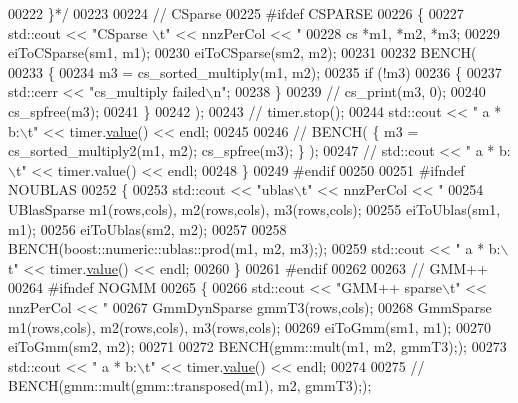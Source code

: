 \begin{DoxyCode}
{{{{{00222 \textcolor{comment}{    \}*/}
00223 
00224     \textcolor{comment}{// CSparse}
00225 \textcolor{preprocessor}{    #ifdef CSPARSE}
00226     \{
00227       std::cout << \textcolor{stringliteral}{"CSparse \(\backslash\)t"} << nnzPerCol << \textcolor{stringliteral}{"%
00228       cs *m1, *m2, *m3;
00229       eiToCSparse(sm1, m1);
00230       eiToCSparse(sm2, m2);
00231 
00232       BENCH(
00233       \{
00234         m3 = cs\_sorted\_multiply(m1, m2);
00235         \textcolor{keywordflow}{if} (!m3)
00236         \{
00237           std::cerr << \textcolor{stringliteral}{"cs\_multiply failed\(\backslash\)n"};
00238         \}
00239 \textcolor{comment}{//         cs\_print(m3, 0);}
00240         cs\_spfree(m3);
00241       \}
00242       );
00243 \textcolor{comment}{//       timer.stop();}
00244       std::cout << \textcolor{stringliteral}{"   a * b:\(\backslash\)t"} << timer.\hyperlink{class_eigen_1_1_bench_timer_a26760f963ed8b64c126159bfea57735e}{value}() << endl;
00245 
00246 \textcolor{comment}{//       BENCH( \{ m3 = cs\_sorted\_multiply2(m1, m2); cs\_spfree(m3); \} );}
00247 \textcolor{comment}{//       std::cout << "   a * b:\(\backslash\)t" << timer.value() << endl;}
00248     \}
00249 \textcolor{preprocessor}{    #endif}
00250 
00251 \textcolor{preprocessor}{    #ifndef NOUBLAS}
00252     \{
00253       std::cout << \textcolor{stringliteral}{"ublas\(\backslash\)t"} << nnzPerCol << \textcolor{stringliteral}{"%
00254       UBlasSparse m1(rows,cols), m2(rows,cols), m3(rows,cols);
00255       eiToUblas(sm1, m1);
00256       eiToUblas(sm2, m2);
00257 
00258       BENCH(boost::numeric::ublas::prod(m1, m2, m3););
00259       std::cout << \textcolor{stringliteral}{"   a * b:\(\backslash\)t"} << timer.\hyperlink{class_eigen_1_1_bench_timer_a26760f963ed8b64c126159bfea57735e}{value}() << endl;
00260     \}
00261 \textcolor{preprocessor}{    #endif}
00262 
00263     \textcolor{comment}{// GMM++}
00264 \textcolor{preprocessor}{    #ifndef NOGMM}
00265     \{
00266       std::cout << \textcolor{stringliteral}{"GMM++ sparse\(\backslash\)t"} << nnzPerCol << \textcolor{stringliteral}{"%
00267       GmmDynSparse  gmmT3(rows,cols);
00268       GmmSparse m1(rows,cols), m2(rows,cols), m3(rows,cols);
00269       eiToGmm(sm1, m1);
00270       eiToGmm(sm2, m2);
00271 
00272       BENCH(gmm::mult(m1, m2, gmmT3););
00273       std::cout << \textcolor{stringliteral}{"   a * b:\(\backslash\)t"} << timer.\hyperlink{class_eigen_1_1_bench_timer_a26760f963ed8b64c126159bfea57735e}{value}() << endl;
00274 
00275 \textcolor{comment}{//       BENCH(gmm::mult(gmm::transposed(m1), m2, gmmT3););}
}}}}}}}}
\end{DoxyCode}
